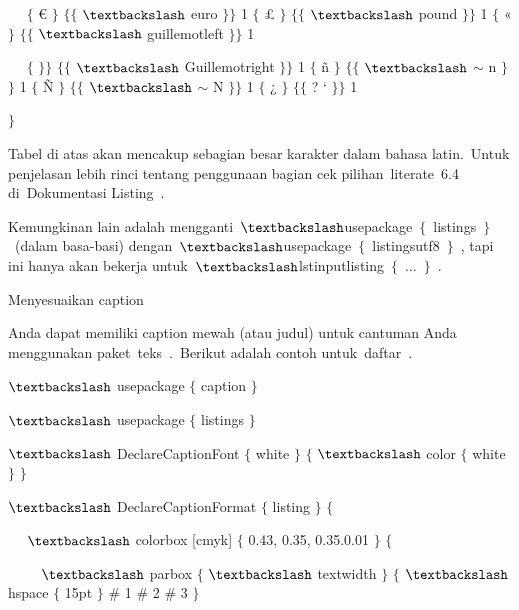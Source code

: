 ~~ $ \{ $ € $ \} $ $ \{ $$ \{ $ $\textbackslash$ euro $ \} $$ \} $ 1 $ \{ $ £ $ \} $ $ \{ $$ \{ $ $\textbackslash$ pound $ \} $$ \} $ 1 $ \{ $ « $ \} $ $ \{ $$ \{ $ $\textbackslash$ guillemotleft $ \} $$ \} $ 1\par

~~ $ \{ $ $ \} $$ \} $ $ \{ $$ \{ $ $\textbackslash$ Guillemotright $ \} $$ \} $ 1 $ \{ $ ñ $ \} $ $ \{ $$ \{ $ $\textbackslash$ $ \sim $ n $ \} $$ \} $ 1 $ \{ $ Ñ $ \} $ $ \{ $$ \{ $ $\textbackslash$ $ \sim $ N $ \} $$ \} $ 1 $ \{ $ ¿ $ \} $ $ \{ $$ \{ $ ? ` $ \} $$ \} $ 1\par

 $ \} $\par

Tabel di atas akan mencakup sebagian besar karakter dalam bahasa latin. Untuk penjelasan lebih rinci tentang penggunaan bagian cek pilihan literate 6.4 di Dokumentasi Listing .\par

Kemungkinan lain adalah mengganti $\textbackslash$usepackage $ \{ $ listings $ \} $ (dalam basa-basi) dengan $\textbackslash$usepackage $ \{ $ listingsutf8 $ \} $ , tapi ini hanya akan bekerja untuk $\textbackslash$lstinputlisting $ \{ $ ... $ \} $ .\par

Menyesuaikan caption \par

Anda dapat memiliki caption mewah (atau judul) untuk cantuman Anda menggunakan paket teks . Berikut adalah contoh untuk daftar .\par

 $\textbackslash$ usepackage $ \{ $ caption $ \} $\par

 $\textbackslash$ usepackage $ \{ $ listings $ \} $\par

 $\textbackslash$ DeclareCaptionFont $ \{ $ white $ \} $ $ \{ $ $\textbackslash$ color $ \{ $ white $ \} $ $ \} $\par

 $\textbackslash$ DeclareCaptionFormat $ \{ $ listing $ \} $ $ \{ $\par

~~ $\textbackslash$ colorbox [cmyk] $ \{ $ 0.43, 0.35, 0.35.0.01 $ \} $ $ \{ $\par

~~~~ $\textbackslash$ parbox $ \{ $ $\textbackslash$ textwidth $ \} $ $ \{ $ $\textbackslash$ hspace $ \{ $ 15pt $ \} $ $\#$ 1 $\#$ 2 $\#$ 3 $ \} $\par

